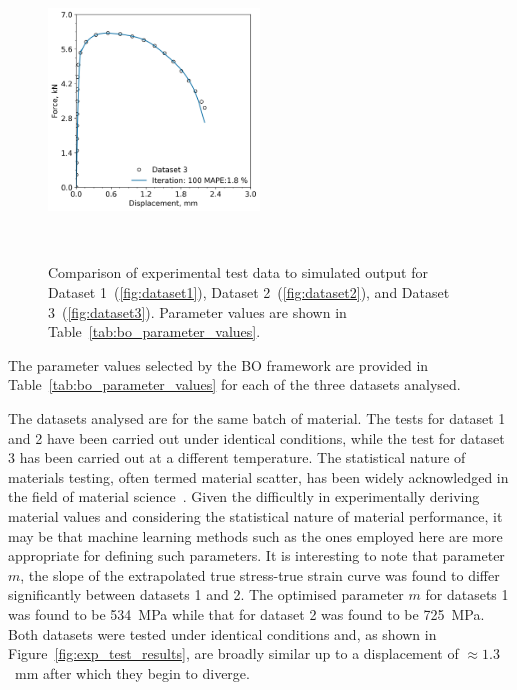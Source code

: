 \documentclass[preprint, review, 12pt]{elsarticle}
\begin{document}
{\begin{figure}[!htbp]
\begin{minipage}[b]{0.5\linewidth}
			\label{fig:dataset2}
		\end{minipage}%
	\vspace{0.2cm}
		\begin{minipage}[b]{\linewidth}
			\centering
			\includegraphics[width=0.5\textwidth, height=0.45\textheight, keepaspectratio]{P91_500_FASTEST_ITERATION}
			\label{fig:dataset3}
		\end{minipage}~\caption{Comparison of experimental test data to simulated output for Dataset 1~(\ref{fig:dataset1}), Dataset 2~(\ref{fig:dataset2}), and Dataset 3~(\ref{fig:dataset3}). Parameter values are shown in Table~\ref{tab:bo_parameter_values}.}
	\label{fig:bo_result}
	\end{figure}
	The parameter values selected by the BO framework are provided in Table~\ref{tab:bo_parameter_values} for each of the three datasets analysed.

	

	The datasets analysed are for the same batch of material.
	The tests for dataset 1 and 2 have been carried out under identical conditions, while the test for dataset 3 has been carried out at a different temperature.
	The statistical nature of materials testing, often termed material scatter, has been widely acknowledged in the field of material science~\cite{OCONNOR2022}.
	Given the difficultly in experimentally deriving material values and considering the statistical nature of material performance, it may be that machine learning methods such as the ones employed here are more appropriate for defining such parameters.
	It is interesting to note that parameter $m$, the slope of the extrapolated true stress-true strain curve was found to differ significantly between datasets 1 and 2.
	The optimised parameter $m$ for datasets 1 was found to be 534~MPa while that for dataset 2 was found to be 725~MPa.
	Both datasets were tested under identical conditions and, as shown in Figure~\ref{fig:exp_test_results}, are broadly similar up to a displacement of $\approx 1.3$~mm after which they begin to diverge.

}
\end{document}
